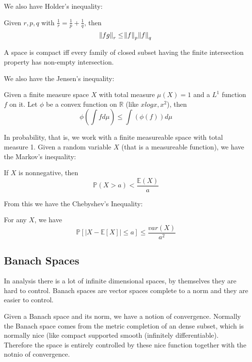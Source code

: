 \documentclass[main.tex]{subfiles}
\begin{document}
We also have Holder's inequality:

\begin{theorem}
Given $r, p, q$ with $\frac{1}{r} = \frac{1}{p} + \frac{1}{q}$, then 
$$
\norm{fg}_r \leq \norm{f}_{p}  \norm{f}_q
$$

A space is compact iff every family of closed subset having the finite intersection property  has non-empty intersection.

\end{theorem}

We also have the Jensen's inequality:

\begin{theorem}
Given a finite measure space $X$ with total measure $\mu(X) = 1$ and a $L^1$ function $f$ on it. Let $\phi$ be a convex function on $\mathbb{R}$ (like $x log x, x^2$), then 
$$
\phi(\int f d\mu) \leq \int (\phi (f)) d\mu
$$
\end{theorem}

In probability, that is, we work with a finite measureable space with total measure 1. Given a random variable $X$ (that is a measureable function), we have the Markov's inequality:

\begin{theorem}
If $X$ is nonnegative, then 
$$
\mathbb{P}(X > a) < \frac{\mathbb{E}(X)}{a}
$$
\end{theorem}

From this we have the Chebyshev's Inequality:

\begin{theorem}
For any $X$, we have 
$$
\mathbb{P}[|X - \mathbb{E}[X]| \leq a] \leq \frac{var(X)}{a^2}
$$
\end{theorem}






\subsection{Banach Spaces}
In analysis there is a lot of infinite dimensional spaces, by themselves they are hard to control. Banach spaces are vector spaces complete to a norm and they are easier to control. 

\begin{remark}
Given a Banach space and its norm, we have a notion of convergence. Normally the Banach space comes from the metric completion of an dense subset, which is normally nice (like compact supported smooth (infinitely differentiable). Therefore the space is entirely controlled by these nice function together with the notnio of convergence.
\end{remark}
\end{document}
